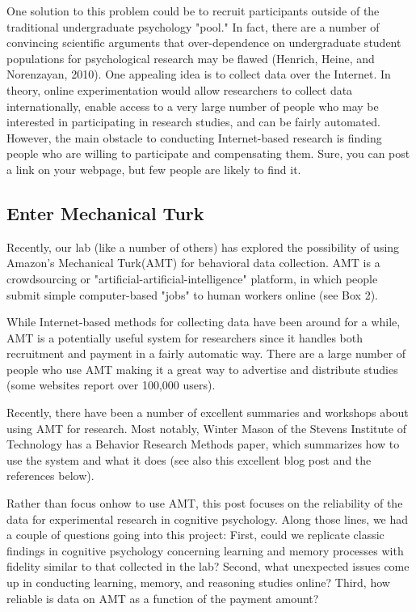 \documentclass[3p,twocolumn,authoryear,10pt]{elsarticle}
\begin{document}
One solution to this problem could be to recruit participants outside of the traditional undergraduate psychology "pool." In fact, there are a number of convincing scientific arguments that over-dependence on undergraduate student populations for psychological research may be flawed (Henrich, Heine, and Norenzayan, 2010). One appealing idea is to collect data over the Internet. In theory, online experimentation would allow researchers to collect data internationally, enable access to a very large number of people who may be interested in participating in research studies, and can be fairly automated. However, the main obstacle to conducting Internet-based research is finding people who are willing to participate and compensating them. Sure, you can post a link on your webpage, but few people are likely to find it.

\subsection{Enter Mechanical Turk}

Recently, our lab (like a number of others) has explored the possibility of using Amazon's Mechanical Turk(AMT) for behavioral data collection. AMT is a crowdsourcing or "artificial-artificial-intelligence" platform, in which people submit simple computer-based "jobs" to human workers online (see Box 2).

While Internet-based methods for collecting data have been around for a while, AMT is a potentially useful system for researchers since it handles both recruitment and payment in a fairly automatic way. There are a large number of people who use AMT making it a great way to advertise and distribute studies (some websites report over 100,000 users).

Recently, there have been a number of excellent summaries and workshops about using AMT for research. Most notably, Winter Mason of the Stevens Institute of Technology has a Behavior Research Methods paper, which summarizes how to use the system and what it does (see also this excellent blog post and the references below).

Rather than focus onhow to use AMT, this post focuses on the reliability of the data for experimental research in cognitive psychology. Along those lines, we had a couple of questions going into this project:
	First, could we replicate classic findings in cognitive psychology concerning learning and memory processes with fidelity similar to that collected in the lab?
	Second, what unexpected issues come up in conducting learning, memory, and reasoning studies online?
	Third, how reliable is data on AMT as a function of the payment amount?
\end{document}
